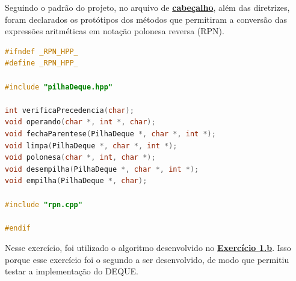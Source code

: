 \documentclass[
  brazilian,
  paper=a4,
  oneside  ,captions=tableheading
]{scrbook}
\begin{document}
Seguindo o padrão do projeto, no arquivo de
\href{https://github.com/ecostadelle/lista_pilhas_filas/blob/main/include/rpn.hpp}{\textbf{cabeçalho}},
além das diretrizes, foram declarados os protótipos dos métodos que
permitiram a conversão das expressões aritméticas em notação polonesa
reversa (RPN).

\begin{lstlisting}[language={C++}]
#ifndef _RPN_HPP_
#define _RPN_HPP_

#include "pilhaDeque.hpp"

int verificaPrecedencia(char);
void operando(char *, int *, char);
void fechaParentese(PilhaDeque *, char *, int *);
void limpa(PilhaDeque *, char *, int *);
void polonesa(char *, int, char *);
void desempilha(PilhaDeque *, char *, int *);
void empilha(PilhaDeque *, char);

#include "rpn.cpp"

#endif
\end{lstlisting}

Nesse exercício, foi utilizado o algoritmo desenvolvido no
\protect\hyperlink{b-implementauxe7uxe3o-de-uma-pilha-utilizando-um-deque}{\textbf{Exercício
1.b}}. Isso porque esse exercício foi o segundo a ser desenvolvido, de
modo que permitiu testar a implementação do DEQUE.

\backmatter
\end{document}
